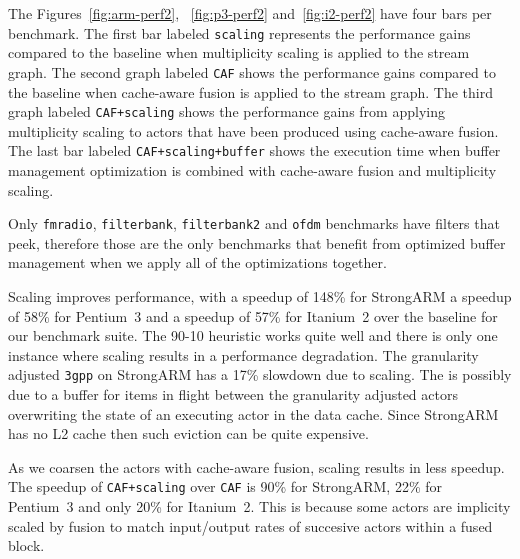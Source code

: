 The Figures~\ref{fig:arm-perf2}, ~\ref{fig:p3-perf2} and~\ref{fig:i2-perf2} 
have four bars per benchmark. The first bar labeled {\tt scaling}
represents the performance gains compared to the baseline when multiplicity
scaling is applied to the stream graph. The second graph labeled 
{\tt CAF} shows the performance gains compared to the baseline when 
cache-aware fusion is applied to the stream graph. The third graph
labeled {\tt CAF+scaling} shows the performance gains from applying
multiplicity scaling to actors that have been produced using cache-aware
fusion. The last bar labeled \texttt{CAF+scaling+buffer} shows the
execution time when buffer management optimization is combined with
cache-aware fusion and multiplicity scaling.


Only \texttt{fmradio}, \texttt{filterbank}, \texttt{filterbank2}
and \texttt{ofdm} benchmarks have filters that peek, therefore those are the 
only benchmarks that benefit from optimized buffer management when we 
apply all of the optimizations together. 


Scaling improves performance, with a speedup of 148\% for
StrongARM a speedup of 58\% for Pentium~3 and a speedup of 57\% for Itanium~2 over the baseline for our benchmark suite. 
The 90-10 heuristic works quite well and there is only one instance
where scaling results in a performance degradation. The granularity adjusted
\texttt{3gpp} on StrongARM has a 17\% slowdown due to scaling. The is possibly 
due to a buffer for items in flight between the granularity adjusted
actors overwriting the state of an executing actor in the data cache.
Since StrongARM has no L2 cache then such eviction can be quite expensive.

As we coarsen the actors with cache-aware fusion, scaling results 
in less speedup. The speedup of \texttt{CAF+scaling} over \texttt{CAF} is
90\% for StrongARM, 22\% for Pentium~3 and only 20\% for Itanium~2. 
This is because some actors are implicity scaled by fusion to match 
input/output rates of succesive actors within a fused block. 





